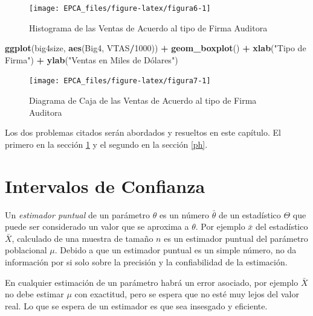 \documentclass[letterpaper,]{book}
\newenvironment{Shaded}{\begin{snugshade}}{\end{snugshade}}
\newcommand{\DecValTok}[1]{\textcolor[rgb]{0.00,0.00,0.81}{#1}}
\newcommand{\KeywordTok}[1]{\textcolor[rgb]{0.13,0.29,0.53}{\textbf{#1}}}
\newcommand{\NormalTok}[1]{#1}
\newcommand{\OperatorTok}[1]{\textcolor[rgb]{0.81,0.36,0.00}{\textbf{#1}}}
\newcommand{\StringTok}[1]{\textcolor[rgb]{0.31,0.60,0.02}{#1}}
\begin{document}
\begin{figure}[h!]

{\centering \texttt{[image: EPCA\_files/figure-latex/figura6-1]} 

}

\caption{Histograma de las Ventas de Acuerdo al tipo de Firma Auditora}\label{fig:figura6}
\end{figure}

\begin{Shaded}
\begin{Highlighting}[]
\KeywordTok{ggplot}\NormalTok{(big4size, }\KeywordTok{aes}\NormalTok{(Big4, VTAS}\OperatorTok{/}\DecValTok{1000}\NormalTok{)) }\OperatorTok{+}\StringTok{ }
\StringTok{  }\KeywordTok{geom_boxplot}\NormalTok{() }\OperatorTok{+}\StringTok{ }\KeywordTok{xlab}\NormalTok{(}\StringTok{"Tipo de Firma"}\NormalTok{) }\OperatorTok{+}
\StringTok{  }\KeywordTok{ylab}\NormalTok{(}\StringTok{"Ventas en Miles de Dólares")}
\end{Highlighting}
\end{Shaded}

\begin{figure}[h!]

{\centering \texttt{[image: EPCA\_files/figure-latex/figura7-1]} 

}

\caption{Diagrama de Caja de las Ventas de Acuerdo al tipo de Firma Auditora}\label{fig:figura7}
\end{figure}

Los dos problemas citados serán abordados y resueltos en este capítulo. El primero en la sección \ref{ic} y el segundo en la sección \ref{ph}.

\hypertarget{ic}{%
\section{Intervalos de Confianza}\label{ic}}

Un \emph{estimador puntual} de un parámetro \(\theta\) es un número \(\bar{\theta}\) de un estadístico \(\Theta\) que puede ser considerado un valor que se aproxima a \(\theta\). Por ejemplo \(\bar{x}\) del estadístico \(\bar{X}\), calculado de una muestra de tamaño \(n\) es un estimador puntual del parámetro poblacional \(\mu\). Debido a que un estimador puntual es un simple número, no da información por si solo sobre la precisión y la confiabilidad de la estimación.

En cualquier estimación de un parámetro habrá un error asociado, por ejemplo \(\bar{X}\) no debe estimar \(\mu\) con exactitud, pero se espera que no esté muy lejos del valor real. Lo que se espera de un estimador es que sea insesgado y eficiente.
\end{document}

